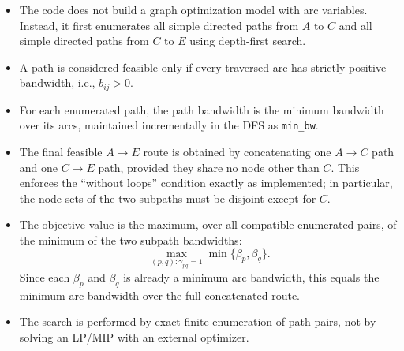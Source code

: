 \begin{itemize}
    \item The code does not build a graph optimization model with arc variables. Instead, it first enumerates all simple directed paths from $A$ to $C$ and all simple directed paths from $C$ to $E$ using depth-first search.
    \item A path is considered feasible only if every traversed arc has strictly positive bandwidth, i.e., $b_{ij}>0$.
    \item For each enumerated path, the path bandwidth is the minimum bandwidth over its arcs, maintained incrementally in the DFS as \texttt{min\_bw}.
    \item The final feasible $A\to E$ route is obtained by concatenating one $A\to C$ path and one $C\to E$ path, provided they share no node other than $C$. This enforces the ``without loops'' condition exactly as implemented; in particular, the node sets of the two subpaths must be disjoint except for $C$.
    \item The objective value is the maximum, over all compatible enumerated pairs, of the minimum of the two subpath bandwidths:
    \[
    \max_{(p,q):\gamma_{pq}=1} \min\{\beta_p,\beta_q\}.
    \]
    Since each $\beta_p$ and $\beta_q$ is already a minimum arc bandwidth, this equals the minimum arc bandwidth over the full concatenated route.
    \item The search is performed by exact finite enumeration of path pairs, not by solving an LP/MIP with an external optimizer.
\end{itemize}

